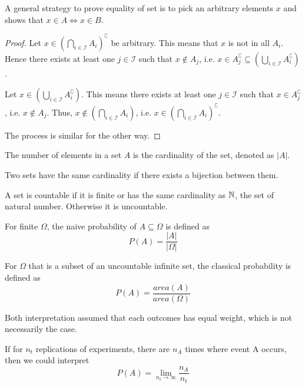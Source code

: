 \documentclass[11pt]{article}
\begin{document}
A general strategy to prove equality of set is to pick an arbitrary elements \(x\) and shows that \(x\in A \iff x \in B\).
\begin{proof}
  Let \(x \in \left(\bigcap_{i\in\mathcal{I}}A_i \right)^\complement\) be arbitrary. This means that \(x\) is not in all \(A_i\). Hence there exists at least one \(j \in \mathcal{I}\) such that \(x \notin A_j\), i.e. \(x \in A_j^\complement \subseteq (\bigcup_{i\in\mathcal{I}}A_i^\complement)\).

  Let \(x \in (\bigcup_{i\in\mathcal{I}}A_i^\complement)\). This means there exists at least one \(j \in \mathcal{I}\) such that \(x \in A_j^\complement\), i.e. \(x \notin A_j\). Thus, \(x \notin (\bigcap_{i\in\mathcal{I}}A_i)\), i.e. \(x \in (\bigcap_{i\in\mathcal{I}}A_i)^\complement\).

  The process is similar for the other way.
\end{proof}

\begin{definition}[Cardinality]
  The number of elements in a set \(A\) is the cardinality of the set, denoted as \(|A|\). 

  Two sets have the same cardinality if there exists a bijection between them.

  A set is countable if it is finite or has the same cardinality as \(\mathbb{N}\), the set of natural number. Otherwise it is uncountable.
\end{definition}

\begin{definition}
  For finite \(\Omega \), the naive probability of \(A\subseteq \Omega\) is defined as \begin{equation*}
    P(A)=\frac{|A|}{|\Omega|}
  \end{equation*}

  For \(\Omega\) that is a subset of an uncountable infinite set, the classical probability is defined as
  \begin{equation*}
    P(A)=\frac{area(A)}{area(\Omega)}
  \end{equation*}
\end{definition}
Both interpretation assumed that each outcomes has equal weight, which is not necessarily the case.

\begin{definition}
  If for \(n_t\) replications of experiments, there are \(n_A\) times where event A occurs, then we could interpret
  \begin{equation*}
    P(A)=\lim_{n_t\to \infty}\frac{n_A}{n_t}
  \end{equation*}
\end{definition}
\end{document}

